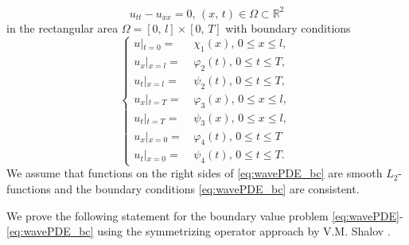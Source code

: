 \documentclass[12pt]{llncs}
\begin{document}
\begin{equation}
u_{tt}-u_{xx}=0,\,\left(x,\,t\right)\in\Omega\subset\mathbb{R}^{2}
\label{eq:wavePDE}
\end{equation}
in the rectangular area $\Omega=\left[0,\,l\right]\times\left[0,\,T\right]$ with boundary conditions
\begin{equation}
\left\{ \begin{aligned}u\left|_{t=0}\right.=\, & \chi_{1}\left(x\right),\,0\leq x\leq l,\,\\
u_{x}\left|_{x=l}\right.=\, & \varphi_{2}\left(t\right),\,0\leq t\leq T,\\
u_{t}\left|_{x=l}\right.=\, & \psi_{2}\left(t\right),\,0\leq t\leq T,\\
u_{x}\left|_{t=T}\right.=\, & \varphi_{3}\left(x\right),\,0\leq x\leq l,\,\\
u_{t}\left|_{t=T}\right.=\, & \psi_{3}\left(x\right),\,0\leq x\leq l,\,\\
u_{x}\left|_{x=0}\right.=\, & \varphi_{4}\left(t\right),\,0\leq t\leq T\\
u_{t}\left|_{x=0}\right.=\, & \psi_{4}\left(t\right),\,0\leq t\leq T.
\end{aligned}
\right.
\label{eq:wavePDE_bc}
\end{equation}
We assume that functions on the right sides of \eqref{eq:wavePDE_bc} are smooth $L_{2}$-functions and the boundary conditions \eqref{eq:wavePDE_bc} are consistent.

We prove the following statement  for the boundary value problem \eqref{eq:wavePDE}-\eqref{eq:wavePDE_bc} using the symmetrizing operator approach by V.M. Shalov \cite{Shalov1965}.
\end{document}
